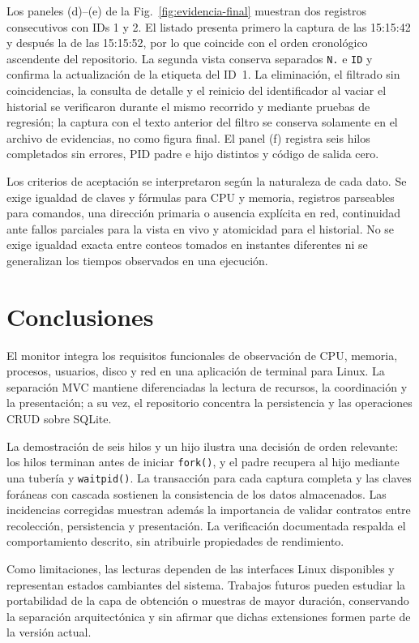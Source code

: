 \documentclass[conference]{IEEEtran}
\begin{document}
Los paneles (d)--(e) de la Fig.~\ref{fig:evidencia-final} muestran dos registros consecutivos con IDs 1 y 2. El listado presenta primero la captura de las 15:15:42 y despu\'es la de las 15:15:52, por lo que coincide con el orden cronol\'ogico ascendente del repositorio. La segunda vista conserva separados \texttt{N.} e \texttt{ID} y confirma la actualizaci\'on de la etiqueta del ID~1. La eliminaci\'on, el filtrado sin coincidencias, la consulta de detalle y el reinicio del identificador al vaciar el historial se verificaron durante el mismo recorrido y mediante pruebas de regresi\'on; la captura con el texto anterior del filtro se conserva solamente en el archivo de evidencias, no como figura final. El panel (f) registra seis hilos completados sin errores, PID padre e hijo distintos y c\'odigo de salida cero.

Los criterios de aceptaci\'on se interpretaron seg\'un la naturaleza de cada dato. Se exige igualdad de claves y f\'ormulas para CPU y memoria, registros parseables para comandos, una direcci\'on primaria o ausencia expl\'icita en red, continuidad ante fallos parciales para la vista en vivo y atomicidad para el historial. No se exige igualdad exacta entre conteos tomados en instantes diferentes ni se generalizan los tiempos observados en una ejecuci\'on.

\section{Conclusiones}
El monitor integra los requisitos funcionales de observaci\'on de CPU, memoria, procesos, usuarios, disco y red en una aplicaci\'on de terminal para Linux. La separaci\'on MVC mantiene diferenciadas la lectura de recursos, la coordinaci\'on y la presentaci\'on; a su vez, el repositorio concentra la persistencia y las operaciones CRUD sobre SQLite.

La demostraci\'on de seis hilos y un hijo ilustra una decisi\'on de orden relevante: los hilos terminan antes de iniciar \texttt{fork()}, y el padre recupera al hijo mediante una tuber\'ia y \texttt{waitpid()}. La transacci\'on para cada captura completa y las claves for\'aneas con cascada sostienen la consistencia de los datos almacenados. Las incidencias corregidas muestran adem\'as la importancia de validar contratos entre recolecci\'on, persistencia y presentaci\'on. La verificaci\'on documentada respalda el comportamiento descrito, sin atribuirle propiedades de rendimiento.

Como limitaciones, las lecturas dependen de las interfaces Linux disponibles y representan estados cambiantes del sistema. Trabajos futuros pueden estudiar la portabilidad de la capa de obtenci\'on o muestras de mayor duraci\'on, conservando la separaci\'on arquitect\'onica y sin afirmar que dichas extensiones formen parte de la versi\'on actual.



\end{document}
